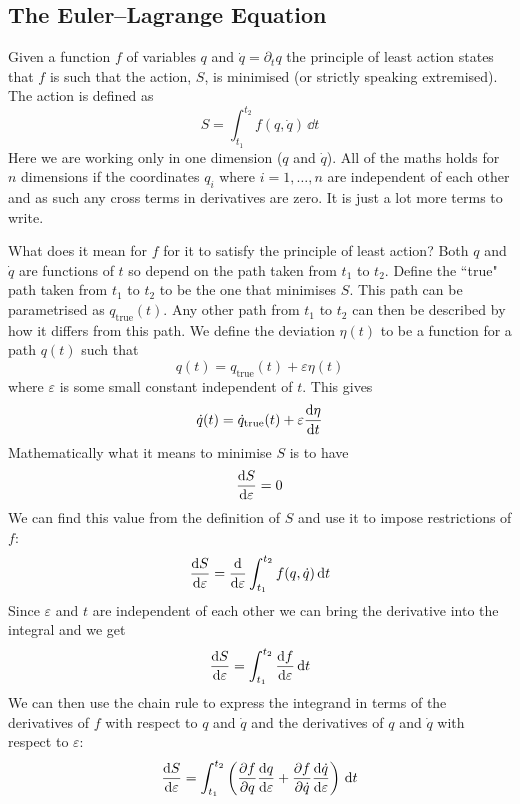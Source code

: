 \documentclass{article}
\begin{document}
    \subsection{The Euler--Lagrange Equation}
    Given a function \(f\) of variables \(q\) and \(\dot q = \partial_t q\) the principle of least action states that \(f\) is such that the action, \(S\), is minimised (or strictly speaking extremised).
    The action is defined as
    \[S = \int_{t_1}^{t_2}f(q, \dot q)\,\dd t\]
    Here we are working only in one dimension (\(q\) and \(\dot q\)).
    All of the maths holds for \(n\) dimensions if the coordinates \(q_i\) where \(i = 1,\dotsc,n\) are independent of each other and as such any cross terms in derivatives are zero.
    It is just a lot more terms to write.
    
    What does it mean for \(f\) for it to satisfy the principle of least action?
    Both \(q\) and \(\dot q\) are functions of \(t\) so depend on the path taken from \(t_1\) to \(t_2\).
    Define the ``true" path taken from \(t_1\) to \(t_2\) to be the one that minimises \(S\).
    This path can be parametrised as \(q_\text{true}(t)\).
    Any other path from \(t_1\) to \(t_2\) can then be described by how it differs from this path.
    We define the deviation \(\eta(t)\) to be a function for a path \(q(t)\) such that
    \begin{equation}\label{eqn:q}
        q(t) = q_\text{true}(t) + \varepsilon\eta(t)
    \end{equation}
    where \(\varepsilon\) is some small constant independent of \(t\).
    This gives
    \begin{equation}\label{eqn:q dot}
        \dot q(t) = \dot q_\text{true}(t) + \varepsilon \dv{\eta}{t}
    \end{equation}
    Mathematically what it means to minimise \(S\) is to have
    \[\dv{S}{\varepsilon} = 0\]
    We can find this value from the definition of \(S\) and use it to impose restrictions of \(f\):
    \[\dv{S}{\varepsilon} = \dv{\varepsilon}\int_{t_1}^{t_2} f(q, \dot q)\,\dd t\]
    Since \(\varepsilon\) and \(t\) are independent of each other we can bring the derivative into the integral and we get
    \[\dv{S}{\varepsilon} = \int_{t_1}^{t_2} \dv{f}{\varepsilon}\,\dd t\]
    We can then use the chain rule to express the integrand in terms of the derivatives of \(f\) with respect to \(q\) and \(\dot q\) and the derivatives of \(q\) and \(\dot q\) with respect to \(\varepsilon\):
    \[\dv{S}{\varepsilon} = \int_{t_1}^{t_2} \left(\pdv{f}{q}\dv{q}{\varepsilon} + \pdv{f}{\dot q}\dv{\dot q}{\varepsilon}\right) \,\dd t\]
\end{document}
